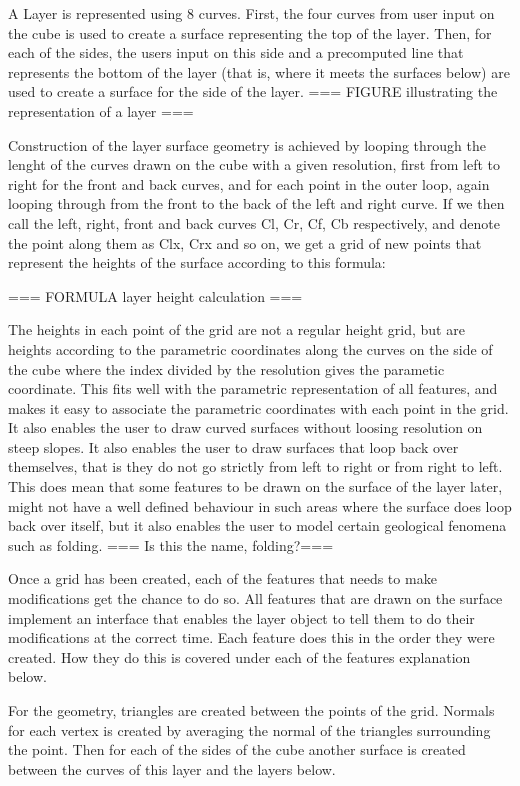 \documentclass[a4paper,10pt]{article}
\begin{document}
A Layer is represented using 8 curves. First, the four curves from user input on the cube is used to create a surface representing the top of the layer. Then, for each of the sides, the users input on this side and a precomputed line that represents the bottom of the layer (that is, where it meets the surfaces below) are used to create a surface for the side of the layer. === FIGURE illustrating the representation of a layer ===

Construction of the layer surface geometry is achieved by looping through the lenght of the curves drawn on the cube with a given resolution, first from left to right for the front and back curves, and for each point in the outer loop, again looping through from the front to the back of the left and right curve. If we then call the left, right, front and back curves Cl, Cr, Cf, Cb respectively, and denote the point along them as Clx, Crx and so on, we get a grid of new points that represent the heights of the surface according to this formula:

=== FORMULA layer height calculation ===

The heights in each point of the grid are not a regular height grid, but are heights according to the parametric coordinates along the curves on the side of the cube where the index divided by the resolution gives the parametic coordinate. This fits well with the parametric representation of all features, and makes it easy to associate the parametric coordinates with each point in the grid. It also enables the user to draw curved surfaces without loosing resolution on steep slopes. It also enables the user to draw surfaces that loop back over themselves, that is they do not go strictly from left to right or from right to left. This does mean that some features to be drawn on the surface of the layer later, might not have a well defined behaviour in such areas where the surface does loop back over itself, but it also enables the user to model certain geological fenomena such as folding. === Is this the name, folding?===

Once a grid has been created, each of the features that needs to make modifications get the chance to do so. All features that are drawn on the surface implement an interface that enables the layer object to tell them to do their modifications at the correct time. Each feature does this in the order they were created. How they do this is covered under each of the features explanation below.

For the geometry, triangles are created between the points of the grid. Normals for each vertex is created by averaging the normal of the triangles surrounding the point. Then for each of the sides of the cube another surface is created between the curves of this layer and the layers below.
\end{document}

